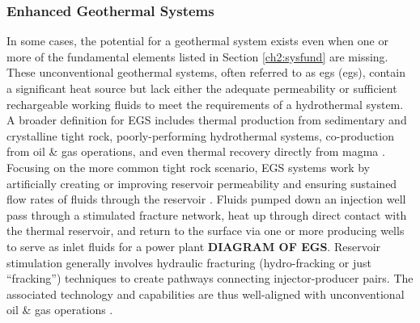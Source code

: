 \subsubsection{Enhanced Geothermal Systems}\label{ch2:egs}
In some cases, the potential for a geothermal system exists even when one or more of the fundamental elements listed in Section \ref{ch2:sysfund} are missing. These unconventional geothermal systems, often referred to as \acrlong{egs} (\acrshort{egs}), contain a significant heat source but lack either the adequate permeability or sufficient rechargeable working fluids to meet the requirements of a hydrothermal system. A broader definition for EGS includes thermal production from sedimentary and crystalline tight rock, poorly-performing hydrothermal systems, co-production from oil \& gas operations, and even thermal recovery directly from magma \citep{tester_future_2006}. Focusing on the more common tight rock scenario, EGS systems work by artificially creating or improving reservoir permeability and ensuring sustained flow rates of fluids through the reservoir \citep[~p. 281]{glassley_geothermal_2015}. Fluids pumped down an injection well pass through a stimulated fracture network, heat up through direct contact with the thermal reservoir, and return to the surface via one or more producing wells to serve as inlet fluids for a power plant \textbf{DIAGRAM OF EGS}. Reservoir stimulation generally involves hydraulic fracturing (hydro-fracking or just “fracking”) techniques to create pathways connecting injector-producer pairs. The associated technology and capabilities are thus well-aligned with unconventional oil \& gas operations \citep{petty_synergies_2009}. 

